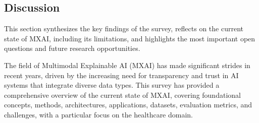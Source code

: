 \documentclass[pdflatex,sn-mathphys-num]{sn-jnl}%
\theoremstyle{thmstyleone}%
\theoremstyle{thmstyletwo}%
\theoremstyle{thmstylethree}%
\begin{document}
\begin{itemize}
\section{Discussion}

This section synthesizes the key findings of the survey, reflects on the current state of MXAI, including its limitations, and highlights the most important open questions and future research opportunities.

The field of Multimodal Explainable AI (MXAI) has made significant strides in recent years, driven by the increasing need for transparency and trust in AI systems that integrate diverse data types. This survey has provided a comprehensive overview of the current state of MXAI, covering foundational concepts, methods, architectures, applications, datasets, evaluation metrics, and challenges, with a particular focus on the healthcare domain.


\end{itemize}
\end{document}
